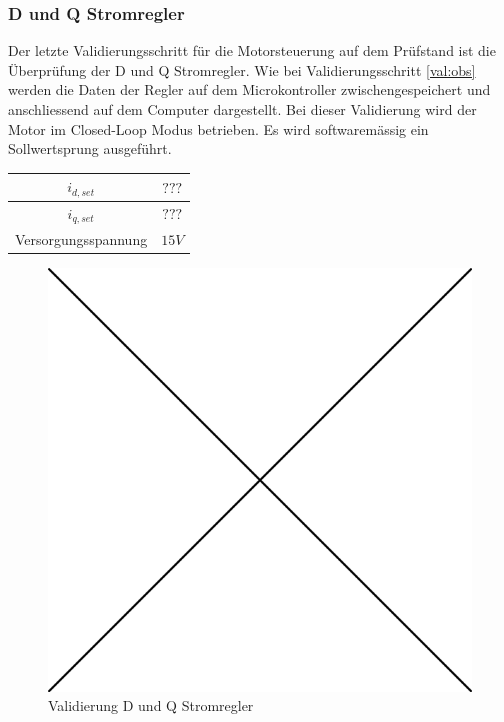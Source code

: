 \subsubsection*{D und Q Stromregler}
Der letzte Validierungsschritt für die Motorsteuerung auf dem Prüfstand ist die Überprüfung der D und Q Stromregler. Wie bei Validierungsschritt \ref{val:obs} werden die Daten der Regler auf dem Microkontroller zwischengespeichert und anschliessend auf dem Computer dargestellt. Bei dieser Validierung wird der Motor im Closed-Loop Modus betrieben. Es wird softwaremässig ein Sollwertsprung ausgeführt.

\begin{center}
	\begin{tabular}{|c|c|}
		\hline 
		$i_{d,set}$ & $???$ \\ \hline
		$i_{q,set}$ & $???$ \\ \hline
		Versorgungsspannung & $15V$ \\ \hline
	\end{tabular} 
	\label{tab:regmessbed}
\end{center}

\begin{figure} [H]
	\centering
	\includegraphics[width=0.5\linewidth]{images/placeholder.png}
	\caption{Validierung D und Q Stromregler}
	\label{fig:reg}
\end{figure}

